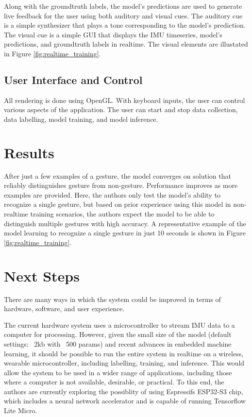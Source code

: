 \documentclass{article}
\begin{document}
Along with the groundtruth labels, the model's predictions are used to generate live feedback for the user using both auditory and visual cues. The auditory cue is a simple synthesizer that plays a tone corresponding to the model's prediction. The visual cue is a simple GUI that displays the IMU timeseries, model's predictions, and groundtruth labels in realtime. The visual elements are illustated in Figure \ref{fig:realtime_training}.

\subsection{User Interface and Control}
All rendering is done using OpenGL. With keyboard inputs, the user can control various aspects of the application. The user can start and stop data collection, data labelling, model training, and model inference.

\section{Results}
After just a few examples of a gesture, the model converges on solution that reliably distinguishes gesture from non-gesture. Performance improves as more examples are provided. Here, the authors only test the model's ability to recognize a single gesture, but based on prior experience using this model in non-realtime training scenarios, the authors expect the model to be able to distinguish multiple gestures with high accuracy. A representative example of the model learning to recognize a single gesture in just 10 seconds is shown in Figure \ref{fig:realtime_training}.

\section{Next Steps}
There are many ways in which the system could be improved in terms of hardware, software, and user experience.

The current hardware system uses a microcontroller to stream IMU data to a computer for processing. However, given the small size of the model (default settings: ~2kb with ~500 params) and recent advances in embedded machine learning, it should be possible to run the entire system in realtime on a wireless, wearable microcontroller, including labelling, training, and inference. This would allow the system to be used in a wider range of applications, including those where a computer is not available, desirable, or practical. To this end, the authors are currently exploring the possiblity of using Espressifs ESP32-S3 chip, which includes a neural network accelerator and is capable of running Tensorflow Lite Micro.
\end{document}
